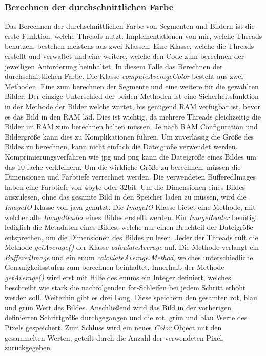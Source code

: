 \subsubsection{Berechnen der durchschnittlichen Farbe}
Das Berechnen der durchschnittlichen Farbe von Segmenten und Bildern ist die erste Funktion, welche Threads nutzt. Implementationen von mir, welche Threads benutzen, bestehen meistens aus zwei Klassen. Eine Klasse, welche die Threads erstellt und verwaltet und eine weitere, welche den Code zum berechnen der jeweiligen Anforderung beinhaltet. In diesem Falle das Berechnen der durchschnittlichen Farbe. Die Klasse \textit{computeAverageColor} besteht aus zwei Methoden. Eine zum berechnen der Segmente und eine weitere für die gewählten Bilder. Der einzige Unterschied der beiden Methoden ist eine Sicherheitsfunktion in der Methode der Bilder welche wartet, bis genügend RAM verfügbar ist, bevor es das Bild in den RAM läd. Dies ist wichtig, da mehrere Threads gleichzeitig die Bilder im RAM zum berechnen halten müssen. Je nach RAM Configuration und Bildergröße kann dies zu Komplikationen führen. Um zuverlässig die Größe des Bildes zu berechnen, kann nicht einfach die Dateigröße verwendet werden. Komprimierungsverfahren wie jpg und png kann die Dateigröße eines Bildes um das 10-fache verkleinern. Um die wirkliche Größe zu berechnen, müssen die Dimensionen und Farbtiefe verrechnet werden. Die verwendeten BufferedImages haben eine Farbtiefe von 4byte oder 32bit. Um die Dimensionen eines Bildes auszulesen, ohne das gesamte Bild in den Speicher laden zu müssen, wird die \textit{ImageIO} Klasse von java genutzt. Die \textit{ImageIO} Klasse bietet eine Methode, mit welcher alle \textit{ImageReader} eines Bildes erstellt werden. Ein \textit{ImageReader} benötigt lediglich die Metadaten eines Bildes, welche nur einen Bruchteil der Dateigröße entsprechen, um die Dimensionen des Bildes zu lesen. Jeder der Threads ruft die Methode \textit{getAverage()} der Klasse \textit{calculateAverage} auf. Die Methode verlangt ein \textit{BufferedImage} und ein enum \textit{calculateAverage.Method}, welches unterschiedliche Genauigkeitsstufen zum berechnen beinhaltet. Innerhalb der Methode \textit{getAverage()} wird erst mit Hilfe des enums ein Integer definiert, welches beschreibt wie stark die nachfolgenden for-Schleifen bei jedem Schritt erhöht werden soll. Weiterhin gibt es drei Long. Diese speichern den gesamten rot, blau und grün Wert des Bildes. Anschließend wird das Bild in der vorherigen definierten Schrittgröße durchgegangen und die rot, grün und blau Werte des Pixels gespeichert. Zum Schluss wird ein neues \textit{Color} Object mit den gesammelten Werten, geteilt durch die Anzahl der verwendeten Pixel, zurückgegeben.

